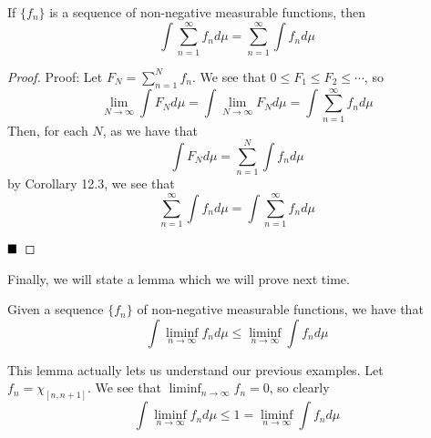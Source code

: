 \begin{lemma}
   If $\{f_n\}$ is a sequence of non-negative measurable functions, then
   \[ \int \sum_{n = 1}^{\infty} f_n d\mu = \sum_{n = 1}^{\infty} \int f_n d\mu \] 
\end{lemma}
\begin{proof}{Proof:}
    Let $F_N = \sum_{n = 1}^{N} f_n$. We see that $0 \leq F_1 \leq F_2 \leq \cdots$, so
    \[ \lim_{N \to \infty} \int F_{N}d\mu = \int \lim_{N \to \infty} F_N d\mu = \int \sum_{n = 1}^{\infty} f_nd\mu \]
    Then, for each $N$, as we have that
    \[ \int F_{N}d\mu = \sum_{n = 1}^{N}\int f_nd\mu \]
    by Corollary 12.3, we see that
    \[ \sum_{n = 1}^{\infty} \int f_n d\mu = \int \sum_{n = 1}^{\infty} f_n d\mu \]

    $\qed$
\end{proof}

Finally, we will state a lemma which we will prove next time.

\begin{lemma}
    Given a sequence $\{f_n\}$ of non-negative measurable functions, we have that
    \[ \int \liminf_{n \to \infty} f_nd\mu \leq \liminf_{n \to \infty} \int f_nd\mu \]
\end{lemma}

This lemma actually lets us understand our previous examples. Let $f_n = \chi_{[n, n + 1]}$. We see that $\liminf_{n \to \infty} f_n = 0$, so clearly
\[ \int \liminf_{n \to \infty} f_nd\mu \leq 1 = \liminf_{n \to \infty} \int f_nd\mu \]